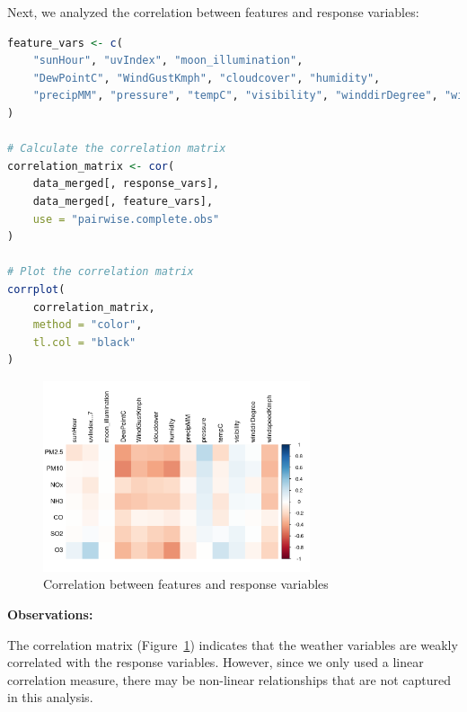 \documentclass[12pt]{article}
\begin{document}
Next, we analyzed the correlation between features and response variables:

\begin{lstlisting}[language=R]
feature_vars <- c(
    "sunHour", "uvIndex", "moon_illumination",
    "DewPointC", "WindGustKmph", "cloudcover", "humidity",
    "precipMM", "pressure", "tempC", "visibility", "winddirDegree", "windspeedKmph"
)

# Calculate the correlation matrix
correlation_matrix <- cor(
    data_merged[, response_vars],
    data_merged[, feature_vars],
    use = "pairwise.complete.obs"
)

# Plot the correlation matrix
corrplot(
    correlation_matrix,
    method = "color",
    tl.col = "black"
)
\end{lstlisting}

\begin{figure}[H]
    \centering
    \includegraphics[width=0.7\textwidth]{feature-response-correlation.png}
    \caption{Correlation between features and response variables}
    \label{fig:feature_response_correlation}
\end{figure}

\textbf{Observations:}

The correlation matrix (Figure~\ref{fig:feature_response_correlation}) indicates that the weather variables are weakly correlated with the response variables. However, since we only used a linear correlation measure, there may be non-linear relationships that are not captured in this analysis.

\newpage

\printbibliography
\end{document}
